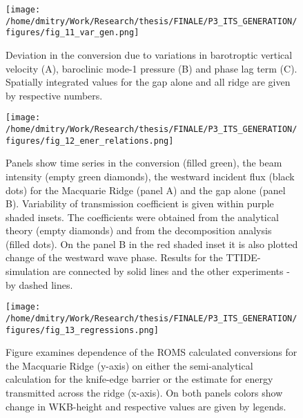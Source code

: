 \documentclass[12pt]{article}
\newcommand{\SCALEO}{2}
\newcommand{\SCALET}{1.25}
\begin{document}
\begin{figure}
	\centering
	\texttt{[image: /home/dmitry/Work/Research/thesis/FINALE/P3\_ITS\_GENERATION/figures/fig\_11\_var\_gen.png]}
	\caption{Deviation in the conversion due to variations in barotroptic vertical velocity (A), 
		baroclinic mode-1 pressure (B) and phase lag term (C). Spatially integrated values for  
		the gap alone and all ridge are given by respective numbers.}
	\label{C3.fig:var_sp}
\end{figure}

\begin{figure}
	\centering
	\texttt{[image: /home/dmitry/Work/Research/thesis/FINALE/P3\_ITS\_GENERATION/figures/fig\_12\_ener\_relations.png]}
	\caption{Panels show time series in the conversion (filled green), the beam 
	intensity (empty green diamonds), the westward incident flux (black dots) for the Macquarie 
	Ridge (panel A) and the gap alone (panel B). Variability of transmission coefficient is given 
	within purple shaded insets. The coefficients were obtained from the analytical theory (empty 
	diamonds) and from the decomposition analysis (filled dots). On the panel B in the red shaded 
	inset it is also plotted change of the westward wave phase. Results for the TTIDE-simulation 
	are connected by solid lines and the other experiments - by dashed lines.}
	\label{C3.fig:ener_var}
\end{figure}

\begin{figure}
	\centering
	\texttt{[image: /home/dmitry/Work/Research/thesis/FINALE/P3\_ITS\_GENERATION/figures/fig\_13\_regressions.png]}
	\caption{Figure examines dependence of the ROMS calculated conversions for the 
	Macquarie Ridge (y-axis) on either the semi-analytical calculation for the knife-edge barrier 
	or the estimate for energy transmitted across the ridge (x-axis). On both panels colors 
	show change in WKB-height and respective values are given by legends.}
	\label{C3.fig:regr}
\end{figure}



\end{document}
